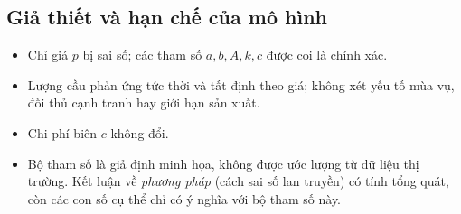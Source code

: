 \subsection{Giả thiết và hạn chế của mô hình}
\begin{itemize}
  \item Chỉ giá $p$ bị sai số; các tham số $a,b,A,k,c$ được coi là chính xác.
  \item Lượng cầu phản ứng tức thời và tất định theo giá; không xét yếu tố mùa vụ,
        đối thủ cạnh tranh hay giới hạn sản xuất.
  \item Chi phí biên $c$ không đổi.
  \item Bộ tham số là giả định minh họa, không được ước lượng từ dữ liệu thị trường.
        Kết luận về \emph{phương pháp} (cách sai số lan truyền) có tính tổng quát,
        còn các con số cụ thể chỉ có ý nghĩa với bộ tham số này.
\end{itemize}

